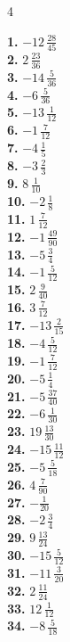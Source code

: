 \documentclass[11pt]{article}
\begin{document}
\begin{multicols}{4}
\raggedright
\setlength{\parskip}{4pt}
\textbf{1.} $-12\,\frac{28}{45}$\\
\textbf{2.} $2\,\frac{23}{36}$\\
\textbf{3.} $-14\,\frac{5}{36}$\\
\textbf{4.} $-6\,\frac{5}{36}$\\
\textbf{5.} $-13\,\frac{1}{12}$\\
\textbf{6.} $-1\,\frac{7}{12}$\\
\textbf{7.} $-4\,\frac{1}{5}$\\
\textbf{8.} $-3\,\frac{2}{3}$\\
\textbf{9.} $8\,\frac{1}{10}$\\
\textbf{10.} $-2\,\frac{1}{8}$\\
\textbf{11.} $1\,\frac{7}{12}$\\
\textbf{12.} $-1\,\frac{49}{90}$\\
\textbf{13.} $-5\,\frac{3}{4}$\\
\textbf{14.} $-1\,\frac{5}{12}$\\
\textbf{15.} $2\,\frac{9}{40}$\\
\textbf{16.} $3\,\frac{7}{12}$\\
\textbf{17.} $-13\,\frac{2}{15}$\\
\textbf{18.} $-4\,\frac{5}{12}$\\
\textbf{19.} $-1\,\frac{7}{12}$\\
\textbf{20.} $-5\,\frac{1}{4}$\\
\textbf{21.} $-5\,\frac{37}{40}$\\
\textbf{22.} $-6\,\frac{1}{30}$\\
\textbf{23.} $19\,\frac{13}{30}$\\
\textbf{24.} $-15\,\frac{11}{12}$\\
\textbf{25.} $-5\,\frac{5}{18}$\\
\textbf{26.} $4\,\frac{7}{90}$\\
\textbf{27.} $-\frac{1}{20}$\\
\textbf{28.} $-2\,\frac{3}{4}$\\
\textbf{29.} $9\,\frac{13}{24}$\\
\textbf{30.} $-15\,\frac{5}{12}$\\
\textbf{31.} $-11\,\frac{3}{20}$\\
\textbf{32.} $2\,\frac{11}{24}$\\
\textbf{33.} $12\,\frac{1}{12}$\\
\textbf{34.} $-8\,\frac{5}{18}$\\

\end{multicols}
\end{document}
